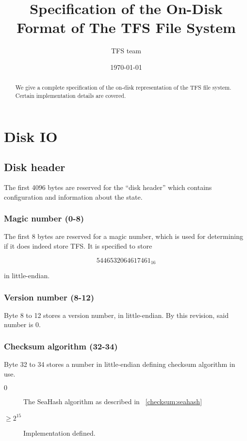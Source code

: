 \documentclass[11pt,a4paper]{report}
\title{Specification of the On-Disk Format of The TFS File System}
\author{TFS team}
\date{\today}
\newcommand{\versionnumber}{0}
\begin{document}
    \maketitle
    \begin{abstract}
        We give a complete specification of the on-disk representation of the
        TFS file system. Certain implementation details are covered.
    \end{abstract}

    \chapter{Disk IO}

    \section{Disk header}
        The first 4096 bytes are reserved for the ``disk header'' which
        contains configuration and information about the state.

        \subsection{Magic number (0-8)}
        The first 8 bytes are reserved for a magic number, which is used for
        determining if it does indeed store TFS. It is specified to store

        $$5446532064617461_{16}$$

        in little-endian.

        \subsection{Version number (8-12)}
        Byte 8 to 12 stores a version number, in little-endian. By this
        revision, said number is \versionnumber.

        \subsection{Checksum algorithm (32-34)}
        \label{config:checksum}
        Byte 32 to 34 stores a number in little-endian defining checksum
        algorithm in use.

        \begin{description}
            \item [$0$] The SeaHash algorithm as described in
                ~\ref{checksum:seahash}
            \item [$\geq 2^{15}$] Implementation defined.
        \end{description}
\end{document}
